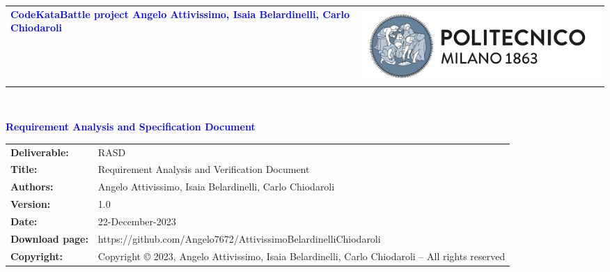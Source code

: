 




\begin{titlepage}


{\begin{table}[t!]
\centering
\begin{tabu} to \textwidth { X[1.3,r,p] X[1.7,l,p] }
\textcolor{Blue}
{\textbf{\small{CodeKataBattle project Angelo Attivissimo, Isaia Belardinelli, Carlo Chiodaroli}}} & \includegraphics[scale=0.5]{Images/PolimiLogo}
\end{tabu}
\end{table}}~\\ [7cm]


\begin{flushleft}

{\textcolor{Blue}{\textbf{\Huge{Requirement Analysis and Specification
        Document}}}} \\ [1cm]

\end{flushleft}

\end{titlepage}

\begin{table}[h!]
\begin{tabu} to \textwidth { X[0.3,r,p] X[0.7,l,p] }
\hline

\textbf{Deliverable:} & RASD\\
\textbf{Title:} & Requirement Analysis and Verification Document \\
\textbf{Authors:} & Angelo Attivissimo, Isaia Belardinelli, Carlo Chiodaroli \\
\textbf{Version:} & 1.0 \\ 
\textbf{Date:} & 22-December-2023 \\
\textbf{Download page:} & https://github.com/Angelo7672/AttivissimoBelardinelliChiodaroli \\
\textbf{Copyright:} & Copyright © 2023, Angelo Attivissimo, Isaia Belardinelli, Carlo Chiodaroli – All rights reserved \\
\hline
\end{tabu}
\end{table}


